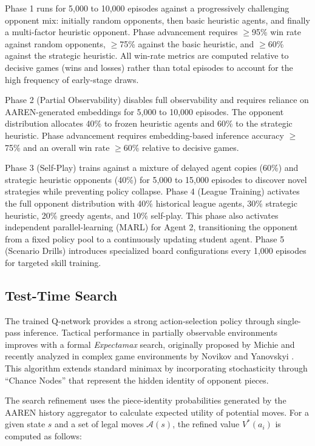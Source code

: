 Phase 1 runs for 5,000 to 10,000 episodes against a progressively challenging opponent mix: initially random opponents, then basic heuristic agents, and finally a multi-factor heuristic opponent. Phase advancement requires $\geq$95\% win rate against random opponents, $\geq$75\% against the basic heuristic, and $\geq$60\% against the strategic heuristic. All win-rate metrics are computed relative to decisive games (wins and losses) rather than total episodes to account for the high frequency of early-stage draws.

Phase 2 (Partial Observability) disables full observability and requires reliance on AAREN-generated embeddings for 5,000 to 10,000 episodes. The opponent distribution allocates 40\% to frozen heuristic agents and 60\% to the strategic heuristic. Phase advancement requires embedding-based inference accuracy $\geq$75\% and an overall win rate $\geq$60\% relative to decisive games.

Phase 3 (Self-Play) trains against a mixture of delayed agent copies (60\%) and strategic heuristic opponents (40\%) for 5,000 to 15,000 episodes to discover novel strategies while preventing policy collapse. Phase 4 (League Training) activates the full opponent distribution with 40\% historical league agents, 30\% strategic heuristic, 20\% greedy agents, and 10\% self-play. This phase also activates independent parallel-learning (MARL) for Agent 2, transitioning the opponent from a fixed policy pool to a continuously updating student agent. Phase 5 (Scenario Drills) introduces specialized board configurations every 1,000 episodes for targeted skill training.


\subsection{Test-Time Search}

The trained Q-network provides a strong action-selection policy through single-pass inference. Tactical performance in partially observable environments improves with a formal \textit{Expectamax} search, originally proposed by Michie \cite{novikov2024analysis} and recently analyzed in complex game environments by Novikov and Yanovskyi \cite{novikov2024analysis}. This algorithm extends standard minimax by incorporating stochasticity through ``Chance Nodes'' that represent the hidden identity of opponent pieces.

The search refinement uses the piece-identity probabilities generated by the AAREN history aggregator to calculate expected utility of potential moves. For a given state $s$ and a set of legal moves $\mathcal{A}(s)$, the refined value $V^*(a_i)$ is computed as follows:


